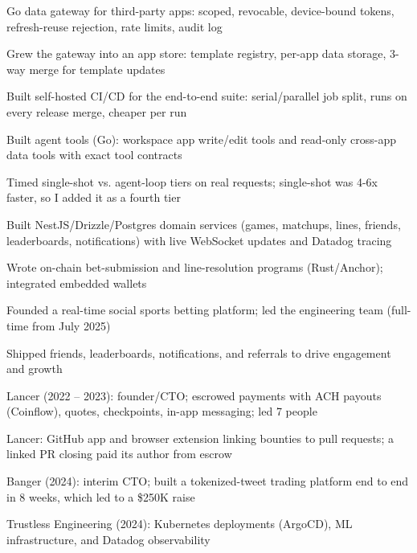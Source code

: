 \documentclass[print]{jack-resume}
\begin{document}
\begin{tightemize}
    \item Go data gateway for third-party apps: scoped, revocable, device-bound tokens, refresh-reuse rejection, rate limits, audit log
    \item Grew the gateway into an app store: template registry, per-app data storage, 3-way merge for template updates
    \item Built self-hosted CI/CD for the end-to-end suite: serial/parallel job split, runs on every release merge, cheaper per run
    \item Built agent tools (Go): workspace app write/edit tools and read-only cross-app data tools with exact tool contracts
    \item Timed single-shot vs. agent-loop tiers on real requests; single-shot was 4-6x faster, so I added it as a fourth tier
\end{tightemize}
\sectionsep

\begin{tightemize}
    \item Built NestJS/Drizzle/Postgres domain services (games, matchups, lines, friends, leaderboards, notifications) with live WebSocket updates and Datadog tracing
    \item Wrote on-chain bet-submission and line-resolution programs (Rust/Anchor); integrated embedded wallets
    \item Founded a real-time social sports betting platform; led the engineering team (full-time from July 2025)
    \item Shipped friends, leaderboards, notifications, and referrals to drive engagement and growth
\end{tightemize}
\sectionsep

\begin{tightemize}
    \item Lancer (2022 -- 2023): founder/CTO; escrowed payments with ACH payouts (Coinflow), quotes, checkpoints, in-app messaging; led 7 people
    \item Lancer: GitHub app and browser extension linking bounties to pull requests; a linked PR closing paid its author from escrow
    \item Banger (2024): interim CTO; built a tokenized-tweet trading platform end to end in 8 weeks, which led to a \$250K raise
    \item Trustless Engineering (2024): Kubernetes deployments (ArgoCD), ML infrastructure, and Datadog observability
\end{tightemize}
\sectionsep
\end{document}
